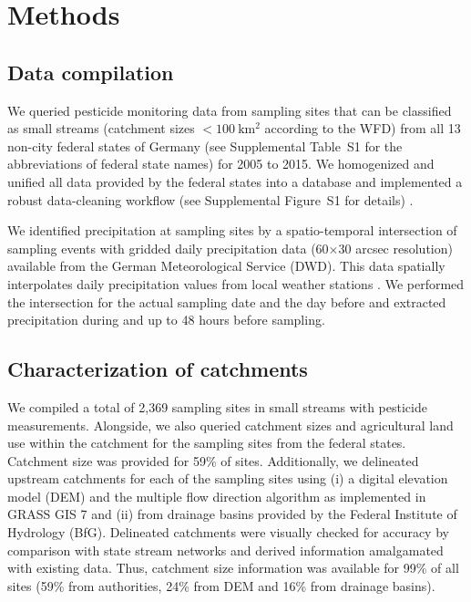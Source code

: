 \documentclass[journal=esthag,manuscript=article]{achemso}
\begin{document}
\section{Methods}
\subsection{Data compilation}
We queried pesticide monitoring data from sampling sites that can be classified as small streams (catchment sizes $\mathrm{< 100~km^2}$ according to the WFD) from all 13 non-city federal states of Germany (see Supplemental Table~S1 for the abbreviations of federal state names) for 2005 to 2015.
We homogenized and unified all data provided by the federal states into a database and implemented a robust data-cleaning workflow (see Supplemental Figure~S1 for details) \citep{poisot_best_2015}.

We identified precipitation at sampling sites by a spatio-temporal intersection of sampling events with gridded daily precipitation data (60$\times$30 arcsec resolution) available from the German Meteorological Service (DWD).
This data spatially interpolates daily precipitation values from local weather stations \citep{rauthe_central_2013}. 
We performed the intersection for the actual sampling date and the day before and extracted precipitation during and up to 48 hours before sampling. 


\subsection{Characterization of catchments}
We compiled a total of 2,369 sampling sites in small streams with pesticide measurements. %
Alongside, we also queried catchment sizes and agricultural land use within the catchment for the sampling sites from the federal states. %
Catchment size was provided for 59\% of sites. 
Additionally, we delineated upstream catchments for each of the sampling sites using (i) a digital elevation model (DEM) \citep{eea_digital_2013} and the multiple flow direction algorithm \citep{holmgren_multiple_1994} as implemented in GRASS GIS 7 \citep{neteler_grass_2012} and (ii) from drainage basins provided by the Federal Institute of Hydrology (BfG). 
Delineated catchments were visually checked for accuracy by comparison with state stream networks and derived information amalgamated with existing data.
Thus, catchment size information was available for 99\% of all sites (59\% from authorities, 24\% from DEM and 16\% from drainage basins). 
\end{document}
